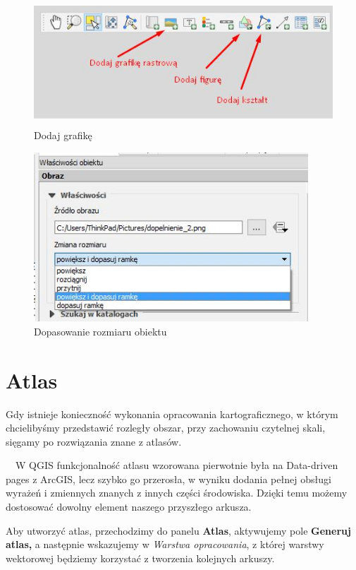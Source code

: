 \documentclass[12pt,a4paper]{book}
\begin{document}
\begin{center}
\begin{figure}
\includegraphics[width=12.598cm,height=4.748cm]{008-grafiki.jpg}
\caption{Dodaj grafikę}
\end{figure}
\end{center}


\begin{center}
\begin{figure}
\includegraphics[width=10.301cm,height=6.339cm]{008-dopasowanie.jpg}
\caption{Dopasowanie rozmiaru obiektu}
\end{figure}
\end{center}
\section{Atlas}
Gdy istnieje konieczność wykonania opracowania kartograficznego, w którym chcielibyśmy przedstawić rozległy obszar, przy zachowaniu czytelnej skali, sięgamy po rozwiązania znane z atlasów.

\ \ W QGIS funkcjonalność atlasu wzorowana pierwotnie była na {\textquotedbl}Data-driven pages{\textquotedbl} z ArcGIS, lecz szybko go przerosła, w wyniku dodania pełnej obsługi wyrażeń i zmiennych znanych z innych części środowiska. Dzięki temu możemy dostosować dowolny element naszego przyszłego arkusza.

Aby utworzyć atlas, przechodzimy do panelu \textbf{Atlas}, aktywujemy pole \textbf{Generuj atlas,} a następnie wskazujemy w \textit{Warstwa opracowania}, z której warstwy wektorowej będziemy korzystać z tworzenia kolejnych arkuszy.
\end{document}
